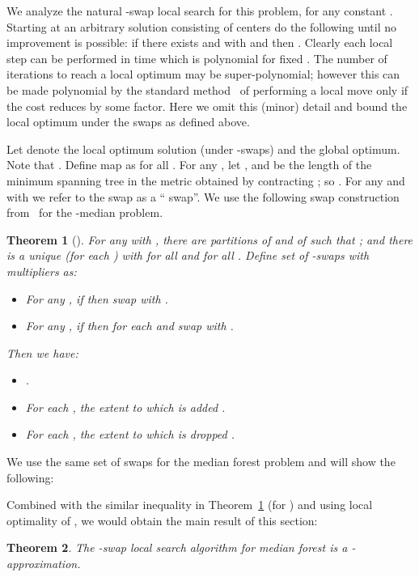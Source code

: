 \documentclass[11pt,twoside,a4paper]{article}
\newtheorem{theorem}{Theorem}
\def\kmf{ median forest\xspace}
\begin{document}
We analyze the natural -swap local search for this problem, for any constant . Starting at an arbitrary solution
 consisting of  centers do the following until no improvement is possible: if there exists  and  with  and  then .
Clearly each local step can be performed in  time which is polynomial for fixed . The number of iterations
to reach a local optimum may be super-polynomial; however this can be made polynomial by the standard
method~\cite{AGKMMP04} of performing a  local move only if the cost  reduces by some  factor.
Here we omit this (minor) detail and bound the local optimum under the swaps as defined above.

Let  denote the local optimum solution (under -swaps) and  the global optimum. Note that
. Define map  as  for all . For any
, let , and  be the length of the minimum
spanning tree in the metric obtained by contracting ; so . For any  and  with  we refer to the swap  as a `` swap''. We use the following swap
construction from~\cite{GT08} for the -median problem.

\begin{theorem}[\cite{GT08}] \label{th:GT-swap}
For any  with , there are partitions  of  and 
of  such that  ; and there is a unique  (for each )
with  for all  and  for all .  Define set
 of -swaps with multipliers  as:
\begin{itemize}
 \item For any , if  then swap  with .
 \item For any , if  then for each  and  swap  with .
\end{itemize}
Then we have:
\begin{itemize}
 \item  .
 \item For each , the extent to which  is added .
\item For each , the extent to which  is dropped .
\end{itemize}
\end{theorem}

We use the same set  of swaps for the \kmf problem and will show the following:


Combined with the similar inequality in Theorem~\ref{th:GT-swap} (for ) and using local optimality of , we
would obtain the main result of this section:
\begin{theorem} The -swap local search algorithm for \kmf is a -approximation.\end{theorem}
\end{document}
